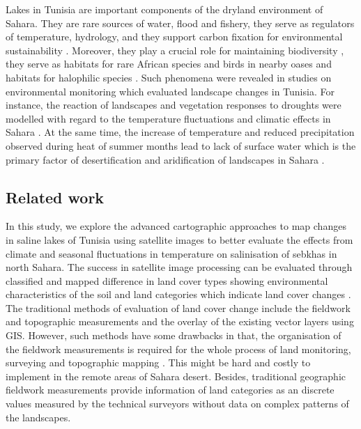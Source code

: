 \documentclass[land,article,submit,pdftex,moreauthors]{Definitions/mdpi}
\begin{document}
Lakes in Tunisia are important components of the dryland environment of Sahara. They are rare sources of water, flood and fishery, they serve as regulators of temperature, hydrology, and they support carbon fixation for environmental sustainability \cite{NIGAM2020201}. Moreover, they play a crucial role for maintaining biodiversity \cite{Neji}, they serve as habitats for rare African species and birds in nearby oases \cite{Baduel,RADDADI2022104806,Kamel} and habitats for halophilic species \cite{NEIFAR20191802}. Such phenomena were revealed in studies on environmental monitoring which evaluated landscape changes in Tunisia. For instance, the reaction of landscapes and vegetation responses to droughts were modelled with regard to the temperature fluctuations and climatic effects in Sahara \cite{HANAFI2008557,PAUSATA2020235,Lemenkova202313}. At the same time, the increase of temperature and reduced precipitation observed during heat of summer months lead to lack of surface water which is the primary factor of desertification and aridification of landscapes in Sahara \cite{OSWALD2023369,DODORICO2013326}. 

\subsection{Related work}

In this study, we explore the advanced cartographic approaches to map changes in saline lakes of Tunisia using satellite images to better evaluate the effects from climate and seasonal fluctuations in temperature on salinisation of sebkhas in north Sahara. The success in satellite image processing can be evaluated through classified and mapped difference in land cover types showing environmental characteristics of the soil and land categories which indicate land cover changes  \cite{Shoshany}. The traditional methods of evaluation of land cover change include the fieldwork and topographic measurements and the overlay of the existing vector layers using GIS. However, such methods have some drawbacks in that, the organisation of the fieldwork measurements is required for the whole process of land monitoring, surveying and topographic mapping \cite{JENDOUBI2020100507}. This might be hard and costly to implement in the remote areas of Sahara desert. Besides, traditional geographic fieldwork measurements provide information of land categories as an discrete values measured by the technical surveyors without data on complex patterns of the landscapes. 
\end{document}
